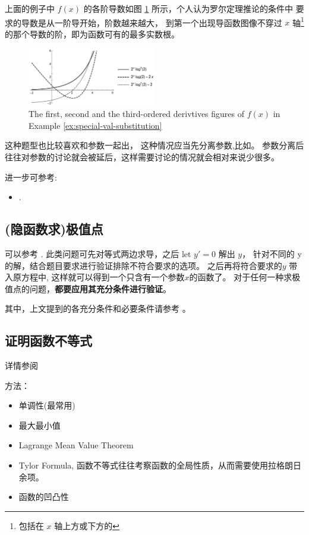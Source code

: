 上面的例子中 $f(x)$ 的各阶导数如图
\ref{fig:3-orders-dervatives-of-2-to-x---x-to2---1} 
所示，个人认为罗尔定理推论的条件中 
要求的导数是从一阶导开始，阶数越来越大，
到第一个出现导函数图像不穿过 $x$ 轴\footnote{包括在 $x$ 轴上方或下方的}
的那个导数的阶，即为函数可有的最多实数根。

\begin{figure}
    \centering
    \includegraphics[width=0.5\textwidth]{figure/3-orders-dervatives-of-2-to-x---x-to2---1.png}
    \caption{The first, second and the third-ordered derivtives figures of $f(x)$ in Example \ref{ex:special-val-substitution}}
    \label{fig:3-orders-dervatives-of-2-to-x---x-to2---1}
\end{figure}

这种题型也比较喜欢和参数一起出，
这种情况应当先分离参数,比如\cite[page 77, pdf 88, 例5]{we}。
参数分离后往往对参数的讨论就会被延后，这样需要讨论的情况就会相对来说少很多。

进一步可参考:
\begin{itemize}
    \item \cite[page 85, pdf 96, example 6]{we}.
\end{itemize}

\subsection{(隐函数求)极值点}

可以参考 \cite[page 71, pdf 82, 例2]{we}.
此类问题可先对等式两边求导，之后 let $y' = 0$ 解出 $y$，
针对不同的 y 的解，结合题目要求进行验证排除不符合要求的选项。
之后再将符合要求的$y$ 带入原方程中, 这样就可以得到一个只含有一个参数$x$的函数了。
对于任何一种求极值点的问题，\textbf{都要应用其充分条件进行验证}。

其中，上文提到的各充分条件和必要条件请参考
\cite[page 68, pdf 79]{we}。

\subsection{证明函数不等式}

详情参阅 \cite[page 79, pdf 90]{we}

方法：
\begin{itemize}
    \item 单调性(最常用)
    \item 最大最小值
    \item Lagrange Mean Value Theorem
    \item Tylor Formula, 函数不等式往往考察函数的全局性质，从而需要使用拉格朗日余项。
    \item 函数的凹凸性
\end{itemize}

